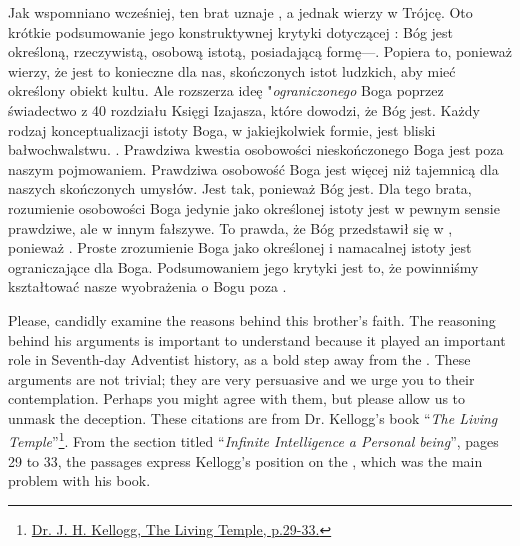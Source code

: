 Jak wspomniano wcześniej, ten brat uznaje , a jednak wierzy w Trójcę. Oto krótkie podsumowanie jego konstruktywnej krytyki dotyczącej : Bóg jest określoną, rzeczywistą, osobową istotą, posiadającą formę—. Popiera to, ponieważ wierzy, że jest to konieczne dla nas, skończonych istot ludzkich, aby mieć określony obiekt kultu. Ale rozszerza ideę "\textit{ograniczonego} Boga poprzez świadectwo z 40 rozdziału Księgi Izajasza, które dowodzi, że Bóg jest. Każdy rodzaj konceptualizacji istoty Boga, w jakiejkolwiek formie, jest bliski bałwochwalstwu. . Prawdziwa kwestia osobowości nieskończonego Boga jest poza naszym pojmowaniem. Prawdziwa osobowość Boga jest więcej niż tajemnicą dla naszych skończonych umysłów. Jest tak, ponieważ Bóg jest. Dla tego brata, rozumienie osobowości Boga jedynie jako określonej istoty jest w pewnym sensie prawdziwe, ale w innym fałszywe. To prawda, że Bóg przedstawił się w , ponieważ . Proste zrozumienie Boga jako określonej i namacalnej istoty jest ograniczające dla Boga. Podsumowaniem jego krytyki jest to, że powinniśmy kształtować nasze wyobrażenia o Bogu poza .


Please, candidly examine the reasons behind this brother’s faith. The reasoning behind his arguments is important to understand because it played an important role in Seventh-day Adventist history, as a bold step away from the . These arguments are not trivial; they are very persuasive and we urge you to their contemplation. Perhaps you might agree with them, but please allow us to unmask the deception. These citations are from Dr. Kellogg’s book “\textit{The Living Temple}”\footnote{\href{https://archive.org/details/J.H.Kellogg.TheLivingTemple1903}{Dr. J. H. Kellogg, The Living Temple, p.29-33.}}. From the section titled “\textit{Infinite Intelligence a Personal being}”, pages 29 to 33, the passages express Kellogg’s position on the , which was the main problem with his book.



